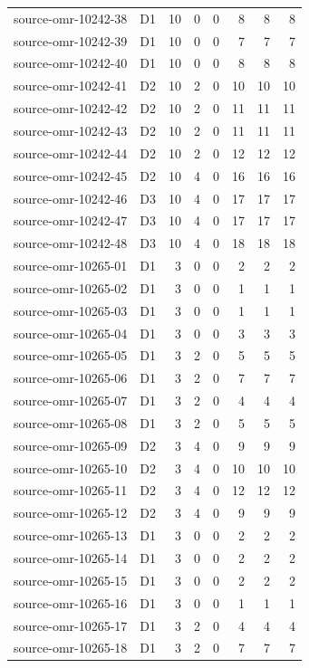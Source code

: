 \begin{longtable}{p{}lrrrrrr}
source-omr-10242-38 & D1 & 10 & 0 & 0 & 8 & 8 & 8\\
source-omr-10242-39 & D1 & 10 & 0 & 0 & 7 & 7 & 7\\
source-omr-10242-40 & D1 & 10 & 0 & 0 & 8 & 8 & 8\\
source-omr-10242-41 & D2 & 10 & 2 & 0 & 10 & 10 & 10\\
source-omr-10242-42 & D2 & 10 & 2 & 0 & 11 & 11 & 11\\
source-omr-10242-43 & D2 & 10 & 2 & 0 & 11 & 11 & 11\\
source-omr-10242-44 & D2 & 10 & 2 & 0 & 12 & 12 & 12\\
source-omr-10242-45 & D2 & 10 & 4 & 0 & 16 & 16 & 16\\
source-omr-10242-46 & D3 & 10 & 4 & 0 & 17 & 17 & 17\\
source-omr-10242-47 & D3 & 10 & 4 & 0 & 17 & 17 & 17\\
source-omr-10242-48 & D3 & 10 & 4 & 0 & 18 & 18 & 18\\
source-omr-10265-01 & D1 & 3 & 0 & 0 & 2 & 2 & 2\\
source-omr-10265-02 & D1 & 3 & 0 & 0 & 1 & 1 & 1\\
source-omr-10265-03 & D1 & 3 & 0 & 0 & 1 & 1 & 1\\
source-omr-10265-04 & D1 & 3 & 0 & 0 & 3 & 3 & 3\\
source-omr-10265-05 & D1 & 3 & 2 & 0 & 5 & 5 & 5\\
source-omr-10265-06 & D1 & 3 & 2 & 0 & 7 & 7 & 7\\
source-omr-10265-07 & D1 & 3 & 2 & 0 & 4 & 4 & 4\\
source-omr-10265-08 & D1 & 3 & 2 & 0 & 5 & 5 & 5\\
source-omr-10265-09 & D2 & 3 & 4 & 0 & 9 & 9 & 9\\
source-omr-10265-10 & D2 & 3 & 4 & 0 & 10 & 10 & 10\\
source-omr-10265-11 & D2 & 3 & 4 & 0 & 12 & 12 & 12\\
source-omr-10265-12 & D2 & 3 & 4 & 0 & 9 & 9 & 9\\
source-omr-10265-13 & D1 & 3 & 0 & 0 & 2 & 2 & 2\\
source-omr-10265-14 & D1 & 3 & 0 & 0 & 2 & 2 & 2\\
source-omr-10265-15 & D1 & 3 & 0 & 0 & 2 & 2 & 2\\
source-omr-10265-16 & D1 & 3 & 0 & 0 & 1 & 1 & 1\\
source-omr-10265-17 & D1 & 3 & 2 & 0 & 4 & 4 & 4\\
source-omr-10265-18 & D1 & 3 & 2 & 0 & 7 & 7 & 7\\

\end{longtable}
